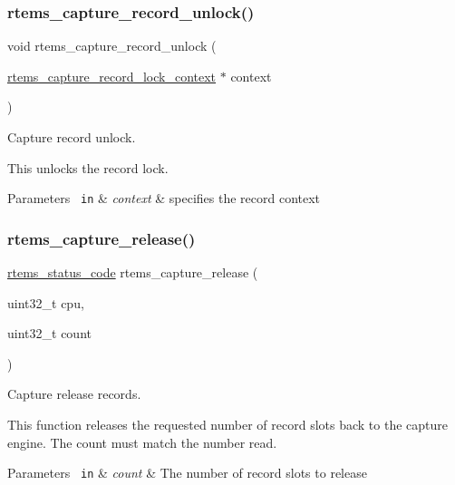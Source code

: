 \subsubsection{\texorpdfstring{rtems\_capture\_record\_unlock()}{rtems\_capture\_record\_unlock()}}
{\footnotesize\ttfamily void rtems\+\_\+capture\+\_\+record\+\_\+unlock (\begin{DoxyParamCaption}\item[{\mbox{\hyperlink{structrtems__capture__record__lock__context}{rtems\+\_\+capture\+\_\+record\+\_\+lock\+\_\+context}} $\ast$}]{context }\end{DoxyParamCaption})}



Capture record unlock. 

This unlocks the record lock.


\begin{DoxyParams}[1]{Parameters}
\mbox{\texttt{ in}}  & {\em context} & specifies the record context \\
\hline
\end{DoxyParams}
\mbox{\label{group__libmisc__capture_ga24a1e78b28e940d3947a32a6548557e6}} 
\subsubsection{\texorpdfstring{rtems\_capture\_release()}{rtems\_capture\_release()}}
{\footnotesize\ttfamily \mbox{\hyperlink{group__ClassicStatus_ga545d41846817eaba6143d52ee4d9e9fe}{rtems\+\_\+status\+\_\+code}} rtems\+\_\+capture\+\_\+release (\begin{DoxyParamCaption}\item[{uint32\+\_\+t}]{cpu,  }\item[{uint32\+\_\+t}]{count }\end{DoxyParamCaption})}



Capture release records. 

This function releases the requested number of record slots back to the capture engine. The count must match the number read.


\begin{DoxyParams}[1]{Parameters}
\mbox{\texttt{ in}}  & {\em count} & The number of record slots to release\\
\hline
\end{DoxyParams}

